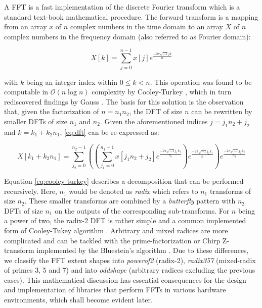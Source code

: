 A FFT is a fast implementation of the discrete Fourier transform which is a standard text-book mathematical procedure. The forward transform is a mapping from an array $x$ of $n$ complex numbers in the time domain to an array $X$ of $n$ complex numbers in the frequency domain (also referred to as Fourier domain):

\begin{equation}
  \label{eq:dft}
  X[k] = \sum_{j=0}^{n-1} x[j]e^{\frac{-2\pi\sqrt{-1}jk}{n}}
\end{equation}

with $k$ being an integer index within $0 \le k < n$. This operation was found to be computable in $\mathcal{O}(n \log n)$ complexity by Cooley-Turkey \cite{cooley1965algorithm}, which in turn rediscovered findings by Gauss \cite{gauss}. The basis for this solution is the observation that, given the factorization of $n=n_1n_2$, the  DFT of size $n$ can be rewritten by smaller DFTs of size $n_1$ and $n_2$.  Given the aforementioned indices $j=j_1n_2 + j_2$ and $k=k_1+k_2n_1$, \cref{eq:dft} can be re-expressed as:

\begin{equation}
  \label{eq:cooley-turkey}
  X[k_1 + k_2n_1] = \sum_{j_2=0}^{n_2-1} \left( \left( \sum_{j_1=0}^{n_1-1} x[j_1n_2 + j_2] e^{\frac{-2\pi\sqrt{-1}j_1k_1}{n_1}} \right) e^{\frac{-2\pi\sqrt{-1}j_2k_1}{n}} \right) e^{\frac{-2\pi\sqrt{-1}j_2k_2}{n_2}}
\end{equation}

Equation \cref{eq:cooley-turkey} describes a decomposition that can be performed recursively. Here, $n_1$ would be denoted as \emph{radix} which refers to $n_1$ transforms of size $n_2$. These smaller transforms are combined by a \emph{butterfly} pattern with $n_2$ DFTs of size $n_1$ on the outputs of the corresponding sub-transforms.
For $n$ being a power of two, the radix-2 DFT is rather simple and a common implemented form of Cooley-Tukey algorithm \cite{cooley1965algorithm}.
Arbitrary and mixed radices are more complicated and can be tackled with the prime-factorization or Chirp Z-transform implemented by the Bluestein's algorithm \cite{bluestein}.
Due to these differences, we classify the FFT extent shapes into \emph{powerof2} (radix-2), \emph{radix357} (mixed-radix of primes 3, 5 and 7) and into \emph{oddshape} (arbitrary radices excluding the previous cases).
This mathematical discussion has essential consequences for the design and implementation of libraries that perform FFTs in various hardware environments, which shall become evident later.

